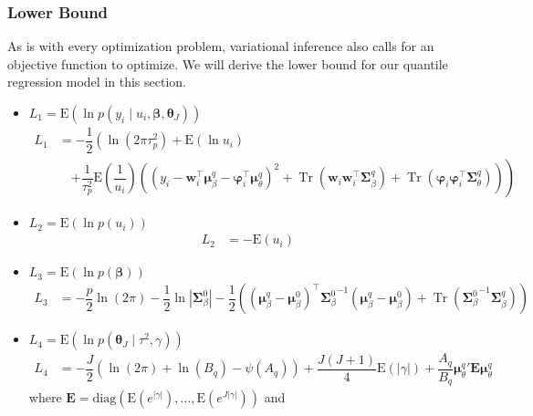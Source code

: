 \documentclass[12pt]{article}
\newcommand{\bs}{\boldsymbol}
\DeclareMathOperator{\Tr}{Tr}
\begin{document}
\subsubsection{Lower Bound}
  As is with every optimization problem, variational inference also calls for an objective function to optimize. We will derive the lower bound for our quantile regression model in this section.
  \begin{itemize}
    \item $L_{1}=\mathrm{E}\left(\ln p\left(y_{i}\;|\;u_{i}, \bs{\beta},\bs{\theta}_{J}\right)\right)$
    \begin{align}
      L_{1} &= -\dfrac{1}{2}\left(\ln\left(2\pi\tau_{p}^{2}\right)+\mathrm{E}\left(\ln u_{i}\right)\right.\\
      &\quad \left.+\dfrac{1}{\tau_{p}^{2}}\mathrm{E}\left(\dfrac{1}{u_{i}}\right)\left(\left(y_{i}-\bs{w}_{i}^{\top}\bs{\mu}_{\beta}^{q}-\bs{\varphi}_{i}^{\top}\bs{\mu}_{\theta}^{q}\right)^{2}+\Tr\left(\bs{w}_{i}\bs{w}_{i}^{\top}\bs{\Sigma}_{\beta}^{q}\right)+\Tr\left(\bs{\varphi}_{i}\bs{\varphi}_{i}^{\top}\bs{\Sigma}_{\theta}^{q}\right) \right)\right)
    \end{align}
    \item $L_{2}=\mathrm{E}\left(\ln p\left(u_{i}\right)\right)$
    \begin{align}
      L_{2} &= -\mathrm{E}\left(u_{i}\right)
    \end{align}
    \item $L_{3}=\mathrm{E}\left(\ln p\left(\bs{\beta}\right)\right)$
    \begin{align}
      L_{3} &= -\dfrac{p}{2}\ln\left(2\pi\right)-\dfrac{1}{2}\ln\left|\bs{\Sigma}_{\beta}^{0}\right| -\dfrac{1}{2}\left(\left(\bs{\mu}_{\beta}^{q}-\bs{\mu}_{\beta}^{0}\right)^{\top}{\bs{\Sigma}_{\beta}^{0}}^{-1}\left(\bs{\mu}_{\beta}^{q}-\bs{\mu}_{\beta}^{0}\right)+\Tr\left({\bs{\Sigma}_{\beta}^{0}}^{-1}\bs{\Sigma}_{\beta}^{q}\right) \right)
    \end{align}
    \item $L_{4}=\mathrm{E}\left(\ln p\left(\bs{\theta}_{J}\;|\;\tau^{2},\gamma\right)\right)$
    \begin{align}
      L_{4} &= -\dfrac{J}{2}\left(\ln\left(2\pi\right)+\ln\left(B_{q}\right)-\psi\left(A_{q}\right)\right)+\dfrac{J\left(J+1\right)}{4}\mathrm{E}\left(\left|\gamma\right|\right)+\dfrac{A_{q}}{B_{q}}{\bs{\mu}_{\theta}^{q}}'\mathbf{E}\bs{\mu}_{\theta}^{q}
    \end{align}
    where $\mathbf{E}=\mathrm{diag}\left(\mathrm{E}\left(e^{\left|\gamma\right|}\right),\ldots,\mathrm{E}\left(e^{J\left|\gamma\right|}\right)\right)$ and

\end{itemize}
\end{document}
